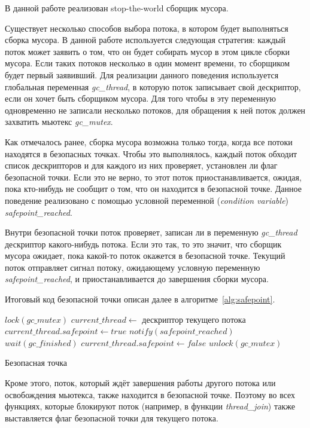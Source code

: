 В данной работе реализован stop-the-world сборщик мусора.

Существует несколько способов выбора потока, в котором будет выполняться сборка мусора. В данной работе используется следующая стратегия: каждый поток может заявить о том, что он будет собирать мусор в этом цикле сборки мусора. Если таких потоков несколько в один момент времени, то сборщиком будет первый заявивший. Для реализации данного поведения используется глобальная переменная \textit{gc\_thread}, в которую поток записывает свой дескриптор, если он хочет быть сборщиком  мусора. Для того чтобы в эту переменную одновременно не записали несколько потоков, для обращения к ней поток должен захватить мьютекс \textit{gc\_mutex}. 

Как отмечалось ранее, сборка мусора возможна только тогда, когда все потоки находятся в безопасных точках. Чтобы это выполнялось, каждый поток обходит список дескрипторов и для каждого из них проверяет, установлен ли флаг безопасной точки. Если это не верно, то этот поток приостанавливается, ожидая, пока кто-нибудь не сообщит о том, что он находится в безопасной точке. Данное поведение реализовано с помощью условной переменной (\textit{condition variable}) \textit{safepoint\_reached}.

Внутри безопасной точки поток проверяет, записан ли в переменную \textit{gc\_thread} дескриптор какого-нибудь потока. Если это так, то это значит, что сборщик мусора ожидает, пока какой-то поток окажется в безопасной точке. Текущий поток отправляет сигнал потоку, ожидающему условную переменную \textit{safepoint\_reached}, и приостанавливается до завершения сборки мусора. 

Итоговый код безопасной точки описан далее в алгоритме~\ref{alg:safepoint}.

\begin{algorithm}[h]
\begin{algorithmic}[1]
\State $lock(gc\_mutex)$
\State $current\_thread \gets$ дескриптор текущего потока
\State $current\_thread.safepoint \gets true$
    \State $notify(safepoint\_reached)$
    \State $wait(gc\_finished)$
\EndIf
\State $current\_thread.safepoint \gets false$
\State $unlock(gc\_mutex)$
\end{algorithmic}
\caption{Безопасная точка}\label{alg:safepoint}
\end{algorithm}

Кроме этого, поток, который ждёт завершения работы другого потока или освобождения мьютекса, также находится в безопасной точке. Поэтому во всех функциях, которые блокируют поток (например, в функции \textit{thread\_join}) также выставляется флаг безопасной точки для текущего потока.

